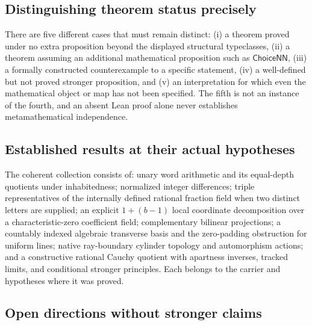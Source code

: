 \subsection{Distinguishing theorem status precisely}\label{supp:16-7}
\par{}\par\smallskip

There are five different cases that must remain distinct: (i) a theorem proved under no extra proposition beyond the displayed structural typeclasses, (ii) a theorem assuming an additional mathematical proposition such as $\mathsf{ChoiceNN}$, (iii) a formally constructed counterexample to a specific statement, (iv) a well-defined but not proved stronger proposition, and (v) an interpretation for which even the mathematical object or map has not been specified. The fifth is not an instance of the fourth, and an absent Lean proof alone never establishes metamathematical independence.

\subsection{Established results at their actual hypotheses}\label{supp:17-1}
\par{}\par\smallskip

The coherent collection consists of: unary word arithmetic and its equal-depth quotients under inhabitedness; normalized integer differences; triple representatives of the internally defined rational fraction field when two distinct letters are supplied; an explicit $1+(b-1)$ local coordinate decomposition over a characteristic-zero coefficient field; complementary bilinear projections; a countably indexed algebraic transverse basis and the zero-padding obstruction for uniform lines; native ray-boundary cylinder topology and automorphism actions; and a constructive rational Cauchy quotient with apartness inverses, tracked limits, and conditional stronger principles. Each belongs to the carrier and hypotheses where it was proved.

\subsection{Open directions without stronger claims}\label{supp:17-2}
\par{}\par\smallskip

